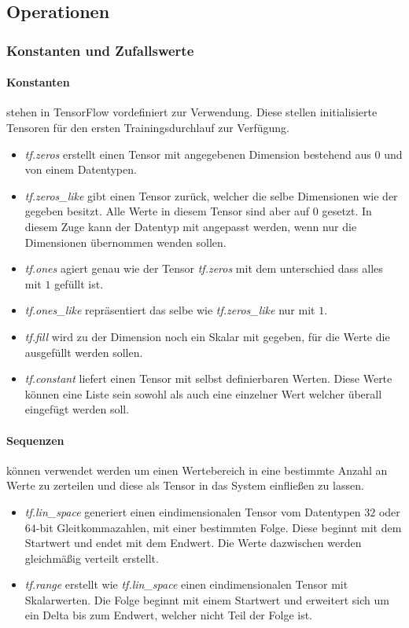 \subsection{Operationen}

\subsubsection{Konstanten und Zufallswerte}

\paragraph{Konstanten} stehen in TensorFlow vordefiniert zur Verwendung.
Diese stellen initialisierte Tensoren für den ersten Trainingsdurchlauf zur Verfügung.

\begin{itemize}
	\item \textit{tf.zeros} erstellt einen Tensor mit angegebenen Dimension bestehend aus $0$ und von einem Datentypen. 
	\item \textit{tf.zeros\_like} gibt einen Tensor zurück, welcher die selbe Dimensionen wie der gegeben besitzt.
	Alle Werte in diesem Tensor sind aber auf $0$ gesetzt.
	In diesem Zuge kann der Datentyp mit angepasst werden, wenn nur die Dimensionen übernommen wenden sollen.
	\item \textit{tf.ones} agiert genau wie der Tensor \textit{tf.zeros} mit dem unterschied dass alles mit $1$ gefüllt ist.
	\item \textit{tf.ones\_like} repräsentiert das selbe wie \textit{tf.zeros\_like} nur mit $1$.
	\item \textit{tf.fill} wird zu der Dimension noch ein Skalar mit gegeben, für die Werte die ausgefüllt werden sollen.
	\item \textit{tf.constant} liefert einen Tensor mit selbst definierbaren Werten. 
	Diese Werte können eine Liste sein sowohl als auch eine einzelner Wert welcher überall eingefügt werden soll. 
\end{itemize}

\paragraph{Sequenzen} können verwendet werden um einen Wertebereich in eine bestimmte Anzahl an Werte zu zerteilen und diese als Tensor in das System einfließen zu lassen.

\begin{itemize}
	\item \textit{tf.lin\_space} generiert einen eindimensionalen Tensor vom Datentypen $32$ oder $64$-bit Gleitkommazahlen, mit einer bestimmten Folge.
	Diese beginnt mit dem Startwert und endet mit dem Endwert. 
	Die Werte dazwischen werden gleichmäßig verteilt erstellt. 
	\item \textit{tf.range} erstellt wie \textit{tf.lin\_space} einen eindimensionalen Tensor mit Skalarwerten. 
	Die Folge beginnt mit einem Startwert und erweitert sich um ein Delta bis zum Endwert, welcher nicht Teil der Folge ist. 
\end{itemize}

